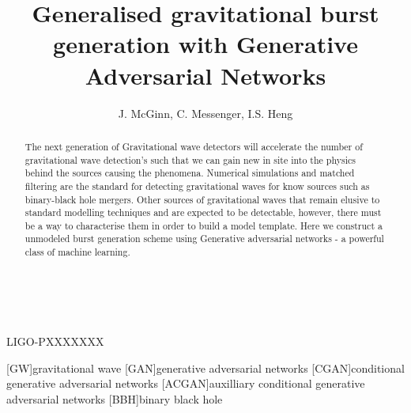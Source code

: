 \documentclass[12pt]{iopart}
\newcommand{\dcc}{LIGO-PXXXXXXX}
\begin{document}
\title{Generalised gravitational burst generation with Generative Adversarial Networks}

\author{J. McGinn, C. Messenger, I.S. Heng}

\address{University of Glasgow, Physics \& Astronomy Department, Glasgow G12 8QQ, UK}
\vspace{10pt}
\begin{indented}
\item[]\commitDATE\\\mbox{\small \commitID}\\\mbox{\dcc}
\end{indented}

\begin{abstract}
The next generation of Gravitational wave detectors will accelerate the number
of gravitational wave detection's such that we can gain new in site into the
physics behind the sources causing the phenomena. Numerical simulations and
matched filtering are the standard for detecting gravitational waves for know
sources such as binary-black hole mergers. Other sources of gravitational waves
that remain elusive to standard modelling techniques and are expected to be
detectable, however, there must be a way to characterise them in order to build
a model template. Here we construct a unmodeled burst generation scheme using
Generative adversarial networks - a powerful class of machine learning.
\end{abstract}

%
%
%
% 
%

[GW]{gravitational wave}
[GAN]{generative adversarial networks}
[CGAN]{conditional generative adversarial networks}
[ACGAN]{auxilliary conditional generative adversarial networks}
[BBH]{binary black hole}
\end{document}
